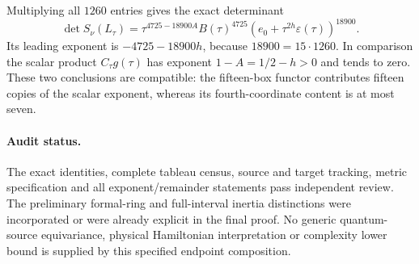 Multiplying all $1260$ entries gives the exact determinant
\[
 \det S_\nu(L_\tau)
 =\tau^{4725-18900A}B(\tau)^{4725}
       (e_0+\tau^{2h}\varepsilon(\tau))^{18900}.
\]
Its leading exponent is $-4725-18900h$, because
$18900=15\cdot1260$. In comparison the scalar product
$C_\tau g(\tau)$ has exponent $1-A=1/2-h>0$ and tends to zero.
These two conclusions are compatible: the fifteen-box functor
contributes fifteen copies of the scalar exponent, whereas its
fourth-coordinate content is at most seven.

\paragraph{Audit status.}
The exact identities, complete tableau census, source and target
tracking, metric specification and all exponent/remainder statements
pass independent review. The preliminary formal-ring and full-interval
inertia distinctions were incorporated or were already explicit in
the final proof. No generic quantum-source equivariance, physical
Hamiltonian interpretation or complexity lower bound is supplied
by this specified endpoint composition.
